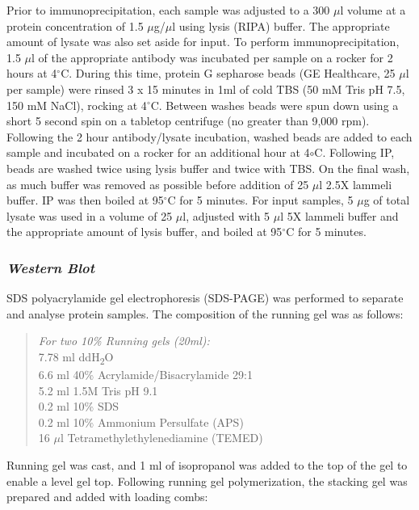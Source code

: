 \documentclass[onehalf,12pt]{beavtex}
\begin{document}
  Prior to immunoprecipitation, each sample was adjusted to a 300 \(\mu\)l
  volume at a protein concentration of 1.5 \(\mu\)g/\(\mu\)l using lysis
  (RIPA) buffer. The appropriate amount of lysate was also set aside for
  input. To perform immunoprecipitation, 1.5 \(\mu\)l of the appropriate
  antibody was incubated per sample on a rocker for 2 hours at
  4\(^\circ\)C. During this time, protein G sepharose beads (GE
  Healthcare, 25 \(\mu\)l per sample) were rinsed 3 x 15 minutes in 1ml of
  cold TBS (50 mM Tris pH 7.5, 150 mM NaCl), rocking at 4\(^\circ\)C.
  Between washes beads were spun down using a short 5 second spin on a
  tabletop centrifuge (no greater than 9,000 rpm). Following the 2 hour
  antibody/lysate incubation, washed beads are added to each sample and
  incubated on a rocker for an additional hour at 4\(\circ\)C. Following
  IP, beads are washed twice using lysis buffer and twice with TBS. On the
  final wash, as much buffer was removed as possible before addition of 25
  \(\mu\)l 2.5X lammeli buffer. IP was then boiled at 95\(^\circ\)C for 5
  minutes. For input samples, 5 \(\mu\)g of total lysate was used in a
  volume of 25 \(\mu\)l, adjusted with 5 \(\mu\)l 5X lammeli buffer and
  the appropriate amount of lysis buffer, and boiled at 95\(^\circ\)C for
  5 minutes.
  
  \subsubsection*{\texorpdfstring{\emph{Western
  Blot}}{Western Blot}}\label{western-blot}
  
  SDS polyacrylamide gel electrophoresis (SDS-PAGE) was performed to
  separate and analyse protein samples. The composition of the running gel
  was as follows:
  
  \begin{quote}
  \emph{For two 10\% Running gels (20ml):}\\
  7.78 ml ddH\textsubscript{2}O\\
  6.6 ml 40\% Acrylamide/Bisacrylamide 29:1\\
  5.2 ml 1.5M Tris pH 9.1\\
  0.2 ml 10\% SDS\\
  0.2 ml 10\% Ammonium Persulfate (APS)\\
  16 \(\mu\)l Tetramethylethylenediamine (TEMED)
  \end{quote}
  
  Running gel was cast, and 1 ml of isopropanol was added to the top of
  the gel to enable a level gel top. Following running gel polymerization,
  the stacking gel was prepared and added with loading combs:
  
\end{document}
